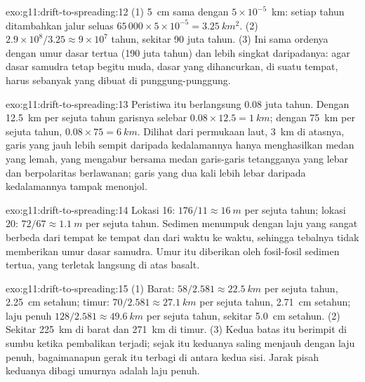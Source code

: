 \begin{solution}{exo:g11:drift-to-spreading:12}
(1) \qty{5}{cm} sama dengan $5 \times 10^{-5}$~\unit{km}: setiap tahun
ditambahkan jalur seluas $65\,000 \times 5 \times 10^{-5} = \qty{3.25}{km^2}$.
(2) $2.9 \times 10^8/3.25 \approx 9 \times 10^7$ tahun, sekitar 90 juta
tahun. (3) Ini sama ordenya dengan umur dasar tertua (190 juta tahun) dan
lebih singkat daripadanya: agar dasar samudra tetap begitu muda, dasar yang
dihancurkan, di suatu tempat, harus sebanyak yang dibuat di punggung-punggung.
\end{solution}

\begin{solution}{exo:g11:drift-to-spreading:13}
Peristiwa itu berlangsung \num{0.08} juta tahun. Dengan \qty{12.5}{km} per
sejuta tahun garisnya selebar $0.08 \times 12.5 = \qty{1}{km}$; dengan
\qty{75}{km} per sejuta tahun, $0.08 \times 75 = \qty{6}{km}$. Dilihat dari
permukaan laut, \qty{3}{km} di atasnya, garis yang jauh lebih sempit daripada
kedalamannya hanya menghasilkan medan yang lemah, yang mengabur bersama medan
garis-garis tetangganya yang lebar dan berpolaritas berlawanan; garis yang
dua kali lebih lebar daripada kedalamannya tampak menonjol.
\end{solution}

\begin{solution}{exo:g11:drift-to-spreading:14}
Lokasi 16: $176/11 \approx \qty{16}{m}$ per sejuta tahun; lokasi 20: $72/67
\approx \qty{1.1}{m}$ per sejuta tahun. Sedimen menumpuk dengan laju yang
sangat berbeda dari tempat ke tempat dan dari waktu ke waktu, sehingga tebalnya
tidak memberikan umur dasar samudra. Umur itu diberikan oleh fosil-fosil
sedimen tertua, yang terletak langsung di atas basalt.
\end{solution}

\begin{solution}{exo:g11:drift-to-spreading:15}
(1) Barat: $58/2.581 \approx \qty{22.5}{km}$ per sejuta tahun,
\qty{2.25}{cm} setahun; timur: $70/2.581 \approx \qty{27.1}{km}$ per sejuta
tahun, \qty{2.71}{cm} setahun; laju penuh $128/2.581 \approx \qty{49.6}{km}$
per sejuta tahun, sekitar \qty{5.0}{cm} setahun. (2) Sekitar \qty{225}{km} di
barat dan \qty{271}{km} di timur. (3) Kedua batas itu berimpit di sumbu ketika
pembalikan terjadi; sejak itu keduanya saling menjauh dengan laju penuh, bagaimanapun
gerak itu terbagi di antara kedua sisi. Jarak pisah keduanya dibagi umurnya
adalah laju penuh.
\end{solution}

